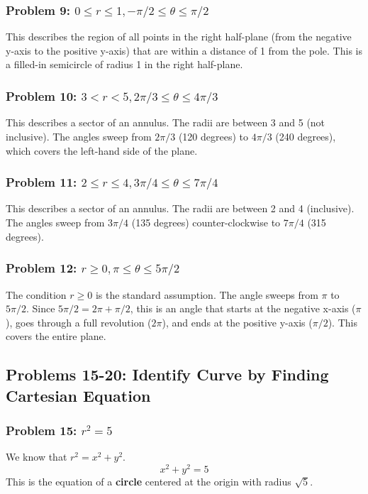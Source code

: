 \documentclass{article}
\begin{document}
\subsubsection*{Problem 9: \(0 \le r \le 1, -\pi/2 \le \theta \le \pi/2\)}
This describes the region of all points in the right half-plane (from the negative y-axis to the positive y-axis) that are within a distance of 1 from the pole. This is a filled-in semicircle of radius 1 in the right half-plane.

\subsubsection*{Problem 10: \(3 < r < 5, 2\pi/3 \le \theta \le 4\pi/3\)}
This describes a sector of an annulus. The radii are between 3 and 5 (not inclusive). The angles sweep from \(2\pi/3\) (120 degrees) to \(4\pi/3\) (240 degrees), which covers the left-hand side of the plane.

\subsubsection*{Problem 11: \(2 \le r \le 4, 3\pi/4 \le \theta \le 7\pi/4\)}
This describes a sector of an annulus. The radii are between 2 and 4 (inclusive). The angles sweep from \(3\pi/4\) (135 degrees) counter-clockwise to \(7\pi/4\) (315 degrees).

\subsubsection*{Problem 12: \(r \ge 0, \pi \le \theta \le 5\pi/2\)}
The condition \(r \ge 0\) is the standard assumption. The angle sweeps from \(\pi\) to \(5\pi/2\). Since \(5\pi/2 = 2\pi + \pi/2\), this is an angle that starts at the negative x-axis (\(\pi\)), goes through a full revolution (\(2\pi\)), and ends at the positive y-axis (\(\pi/2\)). This covers the entire plane.

\subsection*{Problems 15-20: Identify Curve by Finding Cartesian Equation}

\subsubsection*{Problem 15: \(r^2 = 5\)}
We know that \(r^2 = x^2 + y^2\).
\[ x^2 + y^2 = 5 \]
This is the equation of a \textbf{circle} centered at the origin with radius \(\sqrt{5}\).
\end{document}
